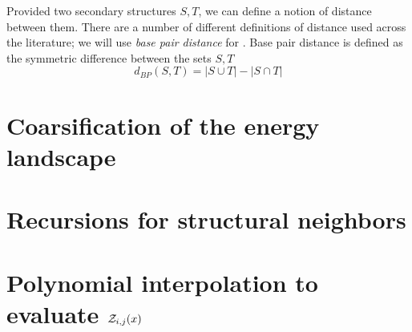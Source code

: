 Provided two secondary structures $S,T$, we can define a notion of
distance between them. There are a number of different definitions of distance
used across the literature; we will use {\em base pair distance} for \fftbor.
Base pair distance is defined as the symmetric difference between the sets
$S,T$
\begin{equation}
\label{eq:dBP}
d_{BP}(S,T) = |S \cup T| - |S \cap T|
\end{equation}

\section{Coarsification of the energy landscape}
\label{sec:fftbor:coarse}

\section{Recursions for structural neighbors}
\label{sec:fftbor:recursions}

\section{Polynomial interpolation to evaluate $\mathcal{Z}_{i,j}(x)$}
\label{sec:fftbor:fft}

